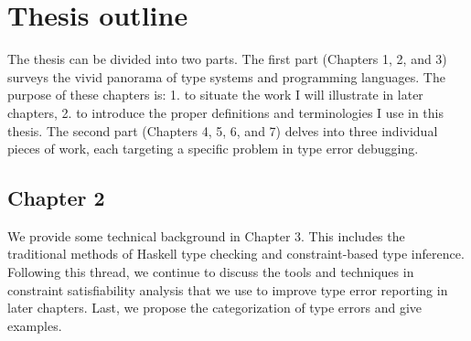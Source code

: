 






\section{Thesis outline}

The thesis can be divided into two parts. The first part (Chapters 1, 2, and 3) surveys the vivid panorama of type systems and programming languages. The purpose of these chapters is: 1. to situate the work I will illustrate in later chapters, 2. to introduce the proper definitions and terminologies I use in this thesis.  The second part (Chapters 4, 5, 6, and 7) delves into three individual pieces of work, each targeting a specific problem in type error debugging.


\subsection{Chapter 2}
We provide some technical background in Chapter 3. This includes the traditional methods of Haskell type checking and constraint-based type inference. Following this thread, we continue to discuss the tools and techniques in constraint satisfiability analysis that we use to improve type error reporting in later chapters. Last, we propose the categorization of type errors and give examples. 

